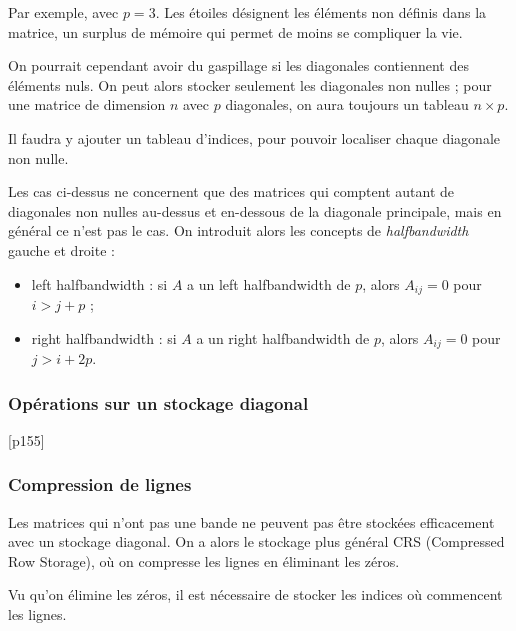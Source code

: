		
		Par exemple, avec $p = 3$. Les étoiles désignent les éléments non définis dans la matrice, un surplus de mémoire qui permet de moins se compliquer la vie.
		
		
		On pourrait cependant avoir du gaspillage si les diagonales contiennent des éléments nuls. On peut alors stocker seulement les diagonales non nulles ; pour une matrice de dimension $n$ avec $p$ diagonales, on aura toujours un tableau $n \times p$.
		
		
		Il faudra y ajouter un tableau d'indices, pour pouvoir localiser chaque diagonale non nulle.
		
		Les cas ci-dessus ne concernent que des matrices qui comptent autant de diagonales non nulles au-dessus et en-dessous de la diagonale principale, mais en général ce n'est pas le cas. On introduit alors les concepts de \textit{halfbandwidth} gauche et droite :
		
		\begin{itemize}
			\item left halfbandwidth : si $A$ a un left halfbandwidth de $p$, alors $A_{ij} = 0$ pour $i > j + p$ ;
			\item right halfbandwidth : si $A$ a un right halfbandwidth de $p$, alors $A_{ij} = 0$ pour $j > i + 2p$.
		\end{itemize}
		
		\subsubsection{Opérations sur un stockage diagonal}
		
		[p155]
		
		\subsubsection{Compression de lignes}
		
		Les matrices qui n'ont pas une bande ne peuvent pas être stockées efficacement avec un stockage diagonal. On a alors le stockage plus général CRS (Compressed Row Storage), où on compresse les lignes en éliminant les zéros.
		
		Vu qu'on élimine les zéros, il est nécessaire de stocker les indices où commencent les lignes.
		
		
